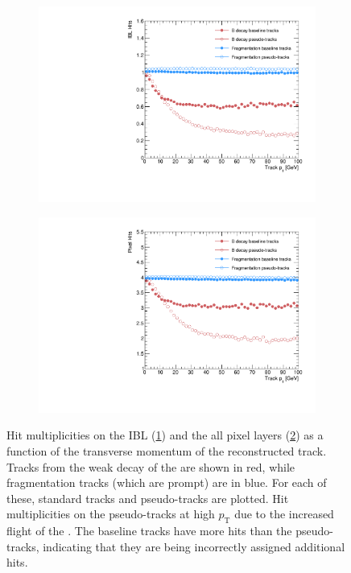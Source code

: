 %
\begin{figure}[!htbp]
    \centering
    \begin{subfigure}{.5\textwidth}
      \centering
      \includegraphics[width=\textwidth]{chapters/3.tracking/figs/overlay_po_nHitsOnIBL_From_B_pT.pdf}
      \caption{}
      \label{fig:n hits on ibl}
    \end{subfigure}%
    \begin{subfigure}{.5\textwidth}
      \centering
      \includegraphics[width=\textwidth]{chapters/3.tracking/figs/overlay_po_nHitsOnPix_From_B_pT.pdf}
      \caption{}
      \label{fig:n hits on pix}
    \end{subfigure}
    \caption{Hit multiplicities on the IBL (\cref{fig:n hits on ibl}) and the all pixel layers (\cref{fig:n hits on pix}) as a function of the transverse momentum \pT of the reconstructed track. Tracks from the weak decay of the \bhadron are shown in red, while fragmentation tracks (which are prompt) are in blue. For each of these, standard tracks and pseudo-tracks are plotted. Hit multiplicities on the pseudo-tracks at high $p_\text{T}$ due to the increased flight of the \bhadron. The baseline tracks have more hits than the pseudo-tracks, indicating that they are being incorrectly assigned additional hits.}
    \label{fig:total hits on pix bs, frag}
\end{figure}
%







